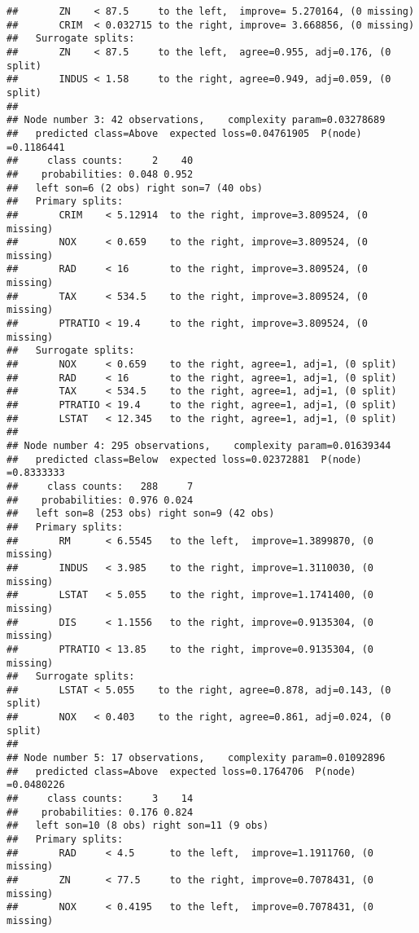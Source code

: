 \documentclass[
]{article}
\begin{document}
\begin{verbatim}
##       ZN    < 87.5     to the left,  improve= 5.270164, (0 missing)
##       CRIM  < 0.032715 to the right, improve= 3.668856, (0 missing)
##   Surrogate splits:
##       ZN    < 87.5     to the left,  agree=0.955, adj=0.176, (0 split)
##       INDUS < 1.58     to the right, agree=0.949, adj=0.059, (0 split)
## 
## Node number 3: 42 observations,    complexity param=0.03278689
##   predicted class=Above  expected loss=0.04761905  P(node) =0.1186441
##     class counts:     2    40
##    probabilities: 0.048 0.952 
##   left son=6 (2 obs) right son=7 (40 obs)
##   Primary splits:
##       CRIM    < 5.12914  to the right, improve=3.809524, (0 missing)
##       NOX     < 0.659    to the right, improve=3.809524, (0 missing)
##       RAD     < 16       to the right, improve=3.809524, (0 missing)
##       TAX     < 534.5    to the right, improve=3.809524, (0 missing)
##       PTRATIO < 19.4     to the right, improve=3.809524, (0 missing)
##   Surrogate splits:
##       NOX     < 0.659    to the right, agree=1, adj=1, (0 split)
##       RAD     < 16       to the right, agree=1, adj=1, (0 split)
##       TAX     < 534.5    to the right, agree=1, adj=1, (0 split)
##       PTRATIO < 19.4     to the right, agree=1, adj=1, (0 split)
##       LSTAT   < 12.345   to the right, agree=1, adj=1, (0 split)
## 
## Node number 4: 295 observations,    complexity param=0.01639344
##   predicted class=Below  expected loss=0.02372881  P(node) =0.8333333
##     class counts:   288     7
##    probabilities: 0.976 0.024 
##   left son=8 (253 obs) right son=9 (42 obs)
##   Primary splits:
##       RM      < 6.5545   to the left,  improve=1.3899870, (0 missing)
##       INDUS   < 3.985    to the right, improve=1.3110030, (0 missing)
##       LSTAT   < 5.055    to the right, improve=1.1741400, (0 missing)
##       DIS     < 1.1556   to the right, improve=0.9135304, (0 missing)
##       PTRATIO < 13.85    to the right, improve=0.9135304, (0 missing)
##   Surrogate splits:
##       LSTAT < 5.055    to the right, agree=0.878, adj=0.143, (0 split)
##       NOX   < 0.403    to the right, agree=0.861, adj=0.024, (0 split)
## 
## Node number 5: 17 observations,    complexity param=0.01092896
##   predicted class=Above  expected loss=0.1764706  P(node) =0.0480226
##     class counts:     3    14
##    probabilities: 0.176 0.824 
##   left son=10 (8 obs) right son=11 (9 obs)
##   Primary splits:
##       RAD     < 4.5      to the left,  improve=1.1911760, (0 missing)
##       ZN      < 77.5     to the right, improve=0.7078431, (0 missing)
##       NOX     < 0.4195   to the left,  improve=0.7078431, (0 missing)

\end{verbatim}
\end{document}
